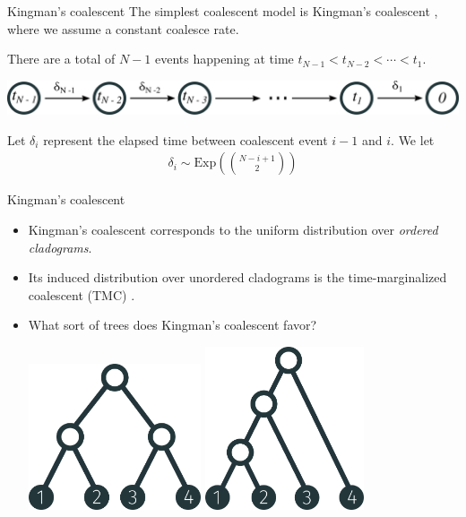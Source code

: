 \documentclass[10pt, compress]{beamer}
\begin{document}
\begin{frame}{Kingman's coalescent}
  The simplest coalescent model is \alert{Kingman's coalescent} \cite{Kingman1982},
  where we assume a constant coalesce rate.

  There are a total of
  $N - 1$ events happening at time $t_{N - 1} < t_{N - 2} < \cdots < t_1$.

  \pause

  \begin{center}
    \includegraphics[width=\textwidth]{img/coalescent-times}
  \end{center}


    Let $\delta_i$ represent the elapsed time
  between coalescent event $i-1$ and $i$.
  We let
  \begin{align}
    \delta_i \sim \mathrm{Exp}\left(\binom{N - i + 1}{2}\right)
  \end{align}

\end{frame}

\begin{frame}{Kingman's coalescent}
  \begin{itemize}
    \item<1-> Kingman's coalescent corresponds
  to the uniform distribution
  over \emph{ordered cladograms}.

    \item<2-> Its induced distribution over
  unordered cladograms is the time-marginalized coalescent (TMC) \cite{Boyles2012}.

    \item<3-> What sort of trees does Kingman's coalescent favor?
      \begin{center}
        \includegraphics[width=0.4\textwidth]{img/tree-1234-balanced} \hspace{0.4em}
        \includegraphics[width=0.37\textwidth]{img/tree-4-unbalanced}
      \end{center}
  \end{itemize}
\end{frame}
\end{document}

